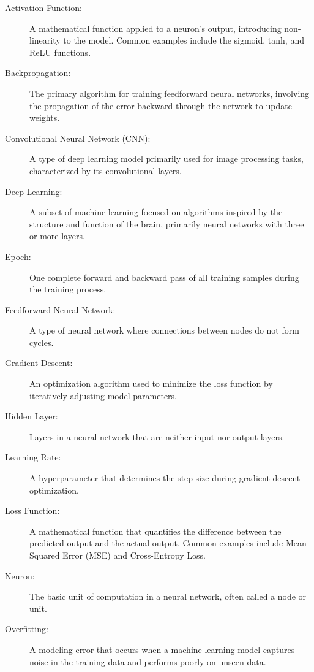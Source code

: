 \begin{description}
    \item[Activation Function:] A mathematical function applied to a neuron's output, introducing non-linearity to the model. Common examples include the sigmoid, tanh, and ReLU functions.
    
    \item[Backpropagation:] The primary algorithm for training feedforward neural networks, involving the propagation of the error backward through the network to update weights.
    
    \item[Convolutional Neural Network (CNN):] A type of deep learning model primarily used for image processing tasks, characterized by its convolutional layers.
    
    \item[Deep Learning:] A subset of machine learning focused on algorithms inspired by the structure and function of the brain, primarily neural networks with three or more layers.
    
    \item[Epoch:] One complete forward and backward pass of all training samples during the training process.
    
    \item[Feedforward Neural Network:] A type of neural network where connections between nodes do not form cycles.
    
    \item[Gradient Descent:] An optimization algorithm used to minimize the loss function by iteratively adjusting model parameters.
    
    \item[Hidden Layer:] Layers in a neural network that are neither input nor output layers.
    
    \item[Learning Rate:] A hyperparameter that determines the step size during gradient descent optimization.
    
    \item[Loss Function:] A mathematical function that quantifies the difference between the predicted output and the actual output. Common examples include Mean Squared Error (MSE) and Cross-Entropy Loss.
    
    \item[Neuron:] The basic unit of computation in a neural network, often called a node or unit.
    
    \item[Overfitting:] A modeling error that occurs when a machine learning model captures noise in the training data and performs poorly on unseen data.
    

\end{description}
